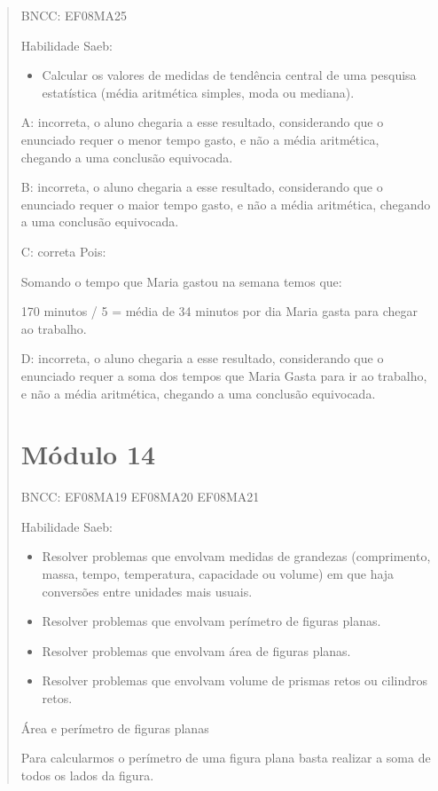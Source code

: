 \begin{quote}
\begin{escolha}
BNCC: EF08MA25

Habilidade Saeb:

\begin{itemize}
\tightlist
\item
  Calcular os valores de medidas de tendência central de uma pesquisa
  estatística (média aritmética simples, moda ou mediana).
\end{itemize}

A: incorreta, o aluno chegaria a esse resultado, considerando que o
enunciado requer o menor tempo gasto, e não a média aritmética, chegando
a uma conclusão equivocada.

B: incorreta, o aluno chegaria a esse resultado, considerando que o
enunciado requer o maior tempo gasto, e não a média aritmética, chegando
a uma conclusão equivocada.

C: correta Pois:

Somando o tempo que Maria gastou na semana temos que:

170 minutos / 5 = média de 34 minutos por dia Maria gasta para chegar ao
trabalho.

D: incorreta, o aluno chegaria a esse resultado, considerando que o
enunciado requer a soma dos tempos que Maria Gasta para ir ao trabalho,
e não a média aritmética, chegando a uma conclusão equivocada.

\chapter{Módulo 14}

BNCC: EF08MA19 EF08MA20 EF08MA21

Habilidade Saeb:

\begin{itemize}
\item
  Resolver problemas que envolvam medidas de grandezas (comprimento,
  massa, tempo, temperatura, capacidade ou volume) em que haja
  conversões entre unidades mais usuais.
\item
  Resolver problemas que envolvam perímetro de figuras planas.
\item
  Resolver problemas que envolvam área de figuras planas.
\item
  Resolver problemas que envolvam volume de prismas retos ou cilindros
  retos.
\end{itemize}

Área e perímetro de figuras planas

Para calcularmos o perímetro de uma figura plana basta realizar a soma
de todos os lados da figura.


\end{escolha}
\end{quote}

